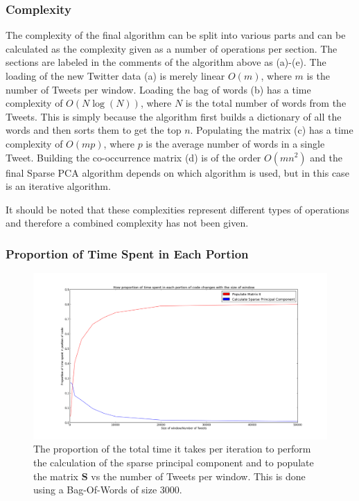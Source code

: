 \documentclass[11pt,a4paper]{article}
\newcommand{\smat}{\mathbf{S}}
\begin{document}
\subsubsection{Complexity}
The complexity of the final algorithm can be split into various parts and can be calculated as the complexity given as a number of operations per section. The sections are labeled in the comments of the algorithm above as (a)-(e). The loading of the new Twitter data (a) is merely linear $O(m)$, where $m$ is the number of Tweets per window. Loading the bag of words (b) has a time complexity of $O(N\log(N))$, where $N$ is the total number of words from the Tweets. This is simply because the algorithm first builds a dictionary of all the words and then sorts them to get the top $n$. Populating the matrix (c) has a time complexity of $O(mp)$, where $p$ is the average number of words in a single Tweet. Building the co-occurrence matrix (d) is of the order $O(mn^2)$ and the final Sparse PCA algorithm depends on which algorithm is used, but in this case is an iterative algorithm. 

It should be noted that these complexities represent different types of operations and therefore a combined complexity has not been given.
 
\subsubsection{Proportion of Time Spent in Each Portion}
\begin{figure}[H]
\centering
\includegraphics[scale=0.30]{proportion_time.png}
\caption{The proportion of the total time it takes per iteration to perform the calculation of the sparse principal component and to populate the matrix $\smat$ vs the number of Tweets per window. This is done using a Bag-Of-Words of size 3000.}
\label{proportion_time}
\end{figure}
\end{document}
